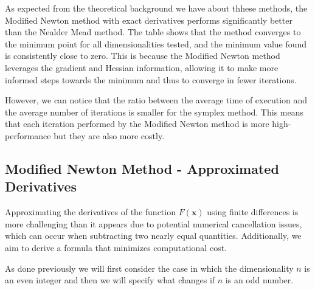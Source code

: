 As expected from the theoretical background we have about thhese methods, the Modified Newton method with exact derivatives performs significantly better than the Nealder Mead method. The table shows that the method converges to the minimum point for all dimensionalities tested, and the minimum value found is consistently close to zero. 
This is because the Modified Newton method leverages the gradient and Hessian information, allowing it to make more informed steps towards the minimum and thus to converge in fewer iterations.

However, we can notice that the ratio between the average time of execution and the average number of iterations is smaller for the symplex method. This means that each iteration performed by the Modified Newton method is more high-performance but they are also more costly. 

\medskip
\subsection*{Modified Newton Method - Approximated Derivatives}
Approximating the derivatives of the function $F(\mathbf{x})$ using finite differences is more challenging than it appears due to potential numerical cancellation issues, which can occur when subtracting two nearly equal quantities. Additionally, we aim to derive a formula that minimizes computational cost.

As done previously we will first consider the case in which the dimensionality $n$ is an even integer and then we will specify what changes if $n$ is an odd number.

